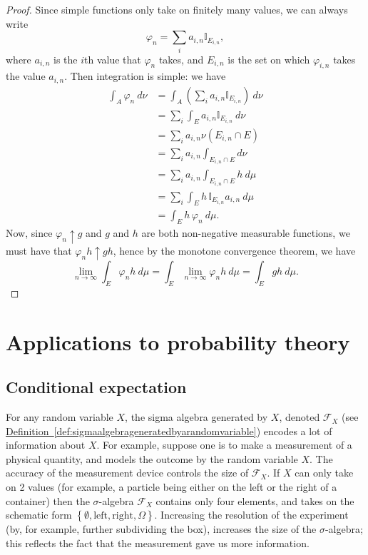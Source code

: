 \documentclass[a4paper,12pt]{scrreprt}
\theoremstyle{definition}
\theoremstyle{plain}
\theoremstyle{remark}
\begin{document}
\begin{proof}
  Since simple functions only take on finitely many values, we can always write
  \begin{equation*}
    \varphi_{n} = \sum_{i} a_{i, n} \mathbb{I}_{E_{i, n}},
  \end{equation*}
  where $a_{i, n}$ is the $i$th value that $\varphi_{n}$ takes, and $E_{i, n}$ is the set on which $\varphi_{i, n}$ takes the value $a_{i, n}$. Then integration is simple: we have
  \begin{align*}
    \int_{A} \varphi_{n}\ d\nu &= \int_{A} \left( \sum_{i} a_{i, n} \mathbb{I}_{E_{i, n}} \right)\ d\nu \\
    &= \sum_{i} \int_{E} a_{i, n} \mathbb{I}_{E_{i, n}}\ d\nu \\
    &= \sum_{i} a_{i, n} \nu(E_{i, n} \cap E) \\
    &= \sum_{i} a_{i, n} \int_{E_{i, n} \cap E} d \nu \\
    &= \sum_{i} a_{i, n} \int_{E_{i, n} \cap E} h\ d\mu \\
    &= \sum_{i} \int_{E} h\,\mathbb{I}_{E_{i, n}} a_{i, n} \ d\mu \\
    &= \int_{E} h\,\varphi_{n}\ d\mu.
  \end{align*}
  Now, since $\varphi_{n} \uparrow g$ and $g$ and $h$ are both non-negative measurable functions, we must have that $\varphi_{n} h \uparrow gh$, hence by the monotone convergence theorem, we have
  \begin{equation*}
    \lim_{n \to \infty} \int_{E} \varphi_{n} h\ d\mu = \int_{E} \lim_{n \to \infty} \varphi_{n} h\ d\mu = \int_{E} gh\ d\mu.
  \end{equation*}
\end{proof}

\chapter{Applications to probability theory}\label{ch:applications_to_probability_theory}

\section{Conditional expectation}
For any random variable $X$, the sigma algebra generated by $X$, denoted $\mathcal{F}_{X}$ (see \hyperref[def:sigmaalgebrageneratedbyarandomvariable]{Definition~\ref*{def:sigmaalgebrageneratedbyarandomvariable}}) encodes a lot of information about $X$. For example, suppose one is to make a measurement of a physical quantity, and models the outcome by the random variable $X$. The accuracy of the measurement device controls the size of $\mathcal{F}_{X}$. If $X$ can only take on 2 values (for example, a particle being either on the left or the right of a container) then the $\sigma$-algebra $\mathcal{F}_{X}$ contains only four elements, and takes on the schematic form $\left\{ \emptyset, \text{left}, \text{right}, \Omega \right\}$. Increasing the resolution of the experiment (by, for example, further subdividing the box), increases the size of the $\sigma$-algebra; this reflects the fact that the measurement gave us more information.
\end{document}
